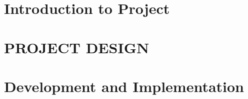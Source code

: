 \documentclass[12pt,includeheadfoot,a4paper]{report}
\begin{document}


\thispagestyle{empty}
\pagetitle
\newpage
{}
\cfoot{\thepage}



\newpage


\newpage
\tableofcontents
\newpage
\listoffigures
\newpage
\listoftables
\newpage


\cfoot{\thepage}




%

\chapter{Introduction to Project}



\chapter{PROJECT DESIGN}

%
%
%
%

%
%
%
%
%

%
%
%


%

\chapter{Development and Implementation}

%
%
%

%


%
%
%
%
\end{document}
